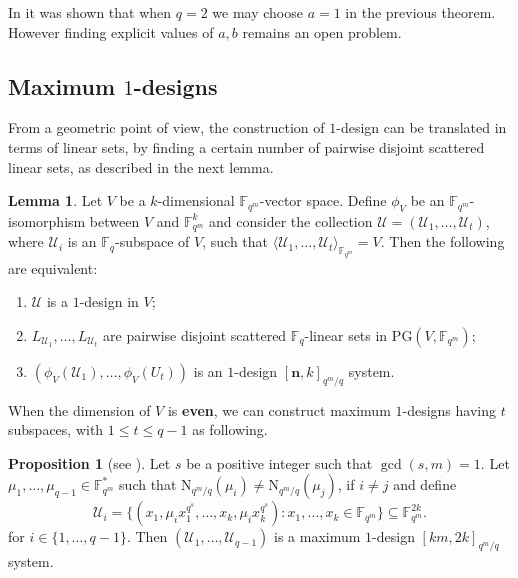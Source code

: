\documentclass[11pt]{amsart}
\theoremstyle{definition}
\newtheorem{lemma}[theorem]{Lemma}
\newtheorem{proposition}[theorem]{Proposition}
\newcommand{\F}{{\mathbb F}}
\newcommand{\U}{{\mathcal{U}}}
\newcommand{\bfn}{\mathbf {n}}
\newcommand{\PG}{\mathrm{PG}}
\newcommand{\N}{\mathrm{N}}
\newcommand{\Fmnk}{[\bfn,k]_{q^m/q}}
\begin{document}
{In \cite[Lemma 2.8]{bartoli2018maximum} it was shown that when $q=2$ we may choose $a=1$ in the previous theorem. However  finding explicit values of $a,b$ remains an open problem. 







\medskip
\subsection{Maximum \texorpdfstring{$1$}{Lg}-designs}


From a geometric point of view, the construction of $1$-design can be translated in terms of linear sets, by finding a certain number of pairwise disjoint scattered linear sets, as described in the next lemma.

\begin{lemma} \label{lem:designdisjoint}
Let $V$ be a $k$-dimensional $\F_{q^m}$-vector space. Define $\phi_{V}$ be an $\F_{q^m}$-isomorphism between $V$ and $\F_{q^m}^k$ and consider the collection $\U=(\mathcal{U}_1,\ldots,\U_t)$, where $\U_i$ is an $\F_q$-subspace of $V$, such that $\langle \mathcal{U}_1,\ldots,\U_t\rangle_{\F_{q^m}}=V$. Then the following are equivalent:
\begin{enumerate}
    \item $\U$ is a $1$-design in $V$;
    \item $L_{\U_1},\ldots,L_{\U_t}$ are pairwise disjoint scattered $\F_q$-linear sets in $\PG(V,\F_{q^m})$;
    \item $(\phi_V(\U_1),\ldots,\phi_V(U_t))$ is an $1$-design $\Fmnk$ system. 
\end{enumerate} 
\end{lemma}


When the dimension of $V$ is {\bf even}, we can construct maximum $1$-designs having $t$ subspaces, with $1 \leq t \leq q-1$ as following.

\begin{proposition} [see \textnormal{\cite[Proposition 5.16]{santonastaso2022subspace}}] \label{prop:ex1desnorm} 
Let $s$ be a positive integer such that $\gcd(s,m)=1$.
Let $\mu_1,\ldots,\mu_{q-1} \in \F_{q^m}^*$ such that $\N_{q^m/q}(\mu_i) \neq \N_{q^m/q}(\mu_j)$, if $i \neq j$ and define
\[\U_i=\{(x_1,\mu_ix_1^{q^s},\ldots,x_k,\mu_ix_k^{q^s})\colon x_1,\ldots,x_k \in \F_{q^m}\}\subseteq \F_{q^m}^{2k}.\] for $i\in \{1,\ldots,q-1\}$. 
Then $(\mathcal{U}_1,\ldots,\mathcal{U}_{q-1})$ is a maximum $1$-design $[km,2k]_{q^m/q}$ system.
\end{proposition}


}
\end{document}
